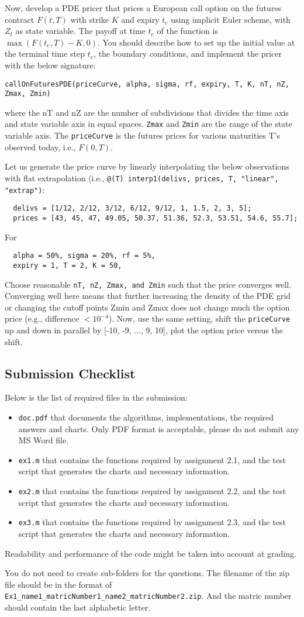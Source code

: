 \documentclass[11pt,a4paper,hidelinks,fleqn]{article}            %
\begin{document}
Now, develop a PDE pricer that prices a European call option on the futures contract $F(t, T)$ with strike $K$ and expiry $t_e$ using implicit Euler scheme, with $Z_t$ as state variable.
The payoff at time $t_e$ of the function is $\max(F(t_e, T) - K, 0)$.
You should describe how to set up the initial value at the terminal time step $t_e$, the boundary conditions, and implement the pricer with the below signature:
\begin{verbatim}
callOnFuturesPDE(priceCurve, alpha, sigma, rf, expiry, T, K, nT, nZ, Zmax, Zmin)
\end{verbatim}
where the nT and nZ are the number of subdivisions that divides the time axis and state variable axis in equal spaces.
\verb=Zmax= and \verb=Zmin= are the range of the state variable axis. 
The \verb=priceCurve= is the futures prices for various maturities T's observed today, i.e., $F(0, T)$.

Let us generate the price curve by linearly interpolating the below observations with flat extrapolation (i.e., \verb=@(T) interp1(delivs, prices, T, "linear", "extrap")=:
\vspace{-0.6cm}
\begin{verbatim}
  delivs = [1/12, 2/12, 3/12, 6/12, 9/12, 1, 1.5, 2, 3, 5];
  prices = [43, 45, 47, 49.05, 50.37, 51.36, 52.3, 53.51, 54.6, 55.7];
\end{verbatim}
For 
\begin{verbatim}
  alpha = 50%, sigma = 20%, rf = 5%, 
  expiry = 1, T = 2, K = 50, 
\end{verbatim}
Choose reasonable \verb=nT, nZ, Zmax, and Zmin= such that the price converges well.
Converging well here means that further increasing the density of the PDE grid or changing the cutoff points Zmin and Zmax does not change much the option price (e.g., difference $ < 10^{-4}$).
Now, use the same setting, shift the \verb=priceCurve= up and down in parallel by [-10, -9, ..., 9, 10], plot the option price versus the shift.

\subsection*{Submission Checklist}
Below is the list of required files in the submission:
\begin{itemize}
\item \verb=doc.pdf= that documents the algorithms, implementations, the required answers and charts. Only PDF format is acceptable, please do not submit any MS Word file.
\item \verb=ex1.m= that contains the functions required by assignment 2.1, and the test script that generates the charts and necessary information.
\item \verb=ex2.m= that contains the functions required by assignment 2.2, and the test script that generates the charts and necessary information.
\item \verb=ex3.m= that contains the functions required by assignment 2.3, and the test script that generates the charts and necessary information.
\end{itemize}
Readability and performance of the code might be taken into account at grading.

You do not need to create sub-folders for the questions. 
The filename of the zip file should be in the format of \verb=Ex1_name1_matricNumber1_name2_matricNumber2.zip=.
And the matric number should contain the last alphabetic letter.
\end{document}
